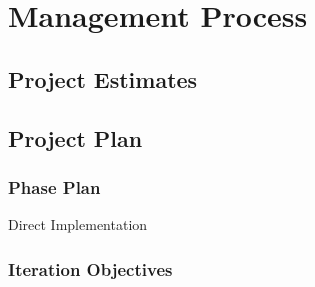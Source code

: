 
\chapter{Management Process} %

\label{Part6Chapter4} %



\section{Project Estimates}




\section{Project Plan}


\subsection{Phase Plan}

Direct Implementation


\subsection{Iteration Objectives}

